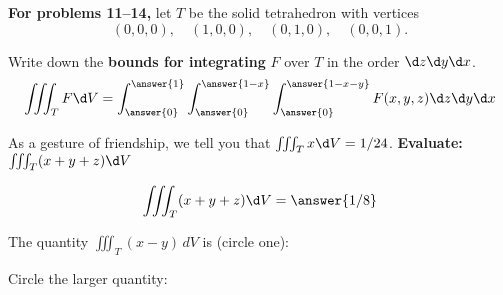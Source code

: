 \documentclass{ximera}
\begin{document}
\textbf{For problems 11--14,} let $T$ be the solid tetrahedron with vertices
$$
(0,0,0), \hspace{1em}
(1,0,0), \hspace{1em}
(0,1,0), \hspace{1em}
(0,0,1).
$$

\begin{problem}
  Write down the \textbf{bounds for integrating} $F$ over $T$ in the order $\d z \d y \d x$.
  \vspace*{.4cm}
  \[
  \iiint_T F  \d V = \int_{\answer{0}}^{\answer{1}} \int_{\answer{0}}^{\answer{1-x}} \int_{\answer{0}}^{\answer{1-x-y}} F(x,y,z) \d z \d y \d x
  \]
  \vspace{.3cm}
\end{problem}

\begin{problem}
  As a gesture of friendship, we tell you that $\iiint_T x \d V = 1/24$.
  \textbf{Evaluate:} \(\iiint_T (x+y+z) \d V \)
  \begin{prompt}
    \[
    \iiint_T (x+y+z) \d V = \answer{1/8}
    \]
  \end{prompt}

  \vfill
\end{problem}

\begin{problem}
  The quantity \(\iiint_T (x - y) \, dV\) is (circle one):
  \begin{multipleChoice}
    \pdfOnly{\end{multicols}}
  \end{multipleChoice}
\end{problem}

\begin{problem}
  Circle the larger quantity:
  \begin{multipleChoice}
      \pdfOnly{\end{multicols}}
    \end{multipleChoice}
\end{problem}
\end{document}
